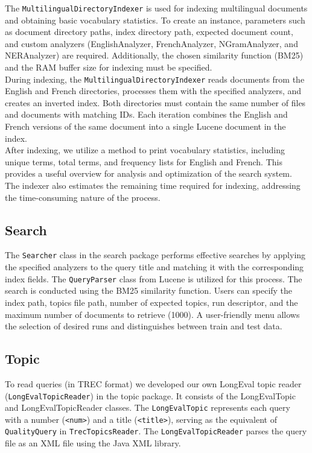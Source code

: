 The \texttt{MultilingualDirectoryIndexer} is used for indexing multilingual documents and obtaining basic vocabulary statistics. 
To create an instance, parameters such as document directory paths, index directory path, expected document count, and custom 
analyzers (EnglishAnalyzer, FrenchAnalyzer, NGramAnalyzer, and NERAnalyzer) are required. 
Additionally, the chosen similarity function (BM25) and the RAM buffer size for indexing must be specified.\\

During indexing, the \texttt{MultilingualDirectoryIndexer} reads documents from the English and French directories, 
processes them with the specified analyzers, and creates an inverted index. Both directories must contain the same 
number of files and documents with matching IDs. Each iteration combines the English and French versions of the same 
document into a single Lucene document in the index.\\

After indexing, we utilize a method to print vocabulary statistics, including unique terms, total terms, and frequency 
lists for English and French. This provides a useful overview for analysis and optimization of the search system. 
The indexer also estimates the remaining time required for indexing, addressing the time-consuming nature of the process.\\

\subsection{Search}\label{subsec:search}
The \texttt{Searcher} class in the search package performs effective searches by applying the specified analyzers 
to the query title and matching it with the corresponding index fields. The \texttt{QueryParser} class from Lucene is 
utilized for this process. The search is conducted using the BM25 similarity function. Users can specify the index path, 
topics file path, number of expected topics, run descriptor, and the maximum number of documents to retrieve (1000). 
A user-friendly menu allows the selection of desired runs and distinguishes between train and test data.\\

\subsection{Topic}\label{subsec:topic}

To read queries (in TREC format) we developed our own LongEval topic reader (\texttt{LongEvalTopicReader}) in the topic package. 
It consists of the LongEvalTopic and LongEvalTopicReader classes. 
The \texttt{LongEvalTopic} represents each query with a number (\texttt{<num>}) and a title (\texttt{<title>}), 
serving as the equivalent of \texttt{QualityQuery} in \texttt{TrecTopicsReader}. 
The \texttt{LongEvalTopicReader} parses the query file as an XML file using the Java XML library.